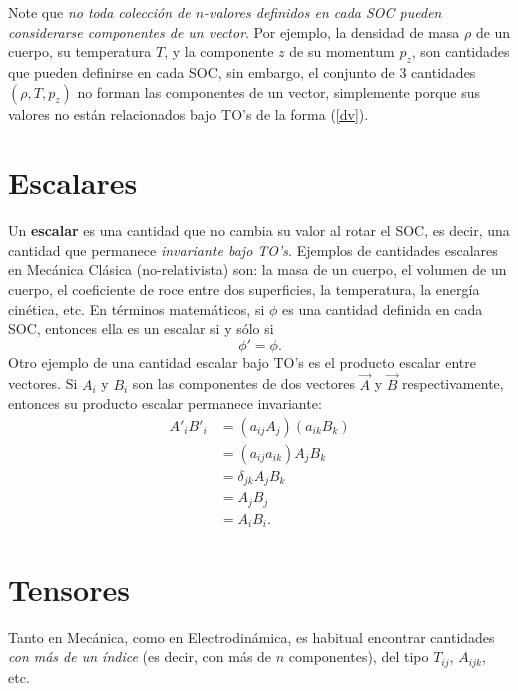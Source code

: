 Note que \textit{no toda colección de $n$-valores definidos en cada SOC pueden considerarse componentes de un vector}. Por ejemplo, la densidad de masa $\rho$ de un cuerpo, su temperatura $T$, y la componente $z$ de su momentum $p_z$, son cantidades que pueden definirse en cada SOC, sin embargo, el conjunto de 3 cantidades $(\rho,T,p_z)$ no forman las componentes de un vector, simplemente porque sus valores no están relacionados bajo TO's de la forma (\ref{dv}).



\section{Escalares}

Un \textbf{escalar} es una cantidad que no cambia su valor al rotar el SOC, es decir, una cantidad que permanece \textit{invariante bajo TO's}. Ejemplos de cantidades escalares en Mecánica Clásica (no-relativista) son: la masa de un cuerpo, el volumen de un cuerpo, el coeficiente de roce entre dos superficies, la temperatura, la energía cinética, etc. En términos matemáticos, si $\phi$ es una cantidad definida en cada SOC, entonces ella es un escalar si y sólo si
\begin{equation}
\phi'=\phi.
\end{equation}
Otro ejemplo de una cantidad escalar bajo TO's es el producto escalar entre vectores. Si $A_i$ y $B_i$ son las componentes de dos vectores $\vec{A}$ y $\vec{B}$ respectivamente, entonces su producto escalar permanece invariante:
\begin{align}
A'_iB'_i &= (a_{ij}A_j)(a_{ik}B_k) \\
&= (a_{ij}a_{ik})A_jB_k \\
&= \delta_{jk}A_jB_k \\ 
&= A_jB_j \\
&= A_iB_i.
\end{align}


\section{Tensores}
Tanto en Mecánica, como en Electrodinámica, es habitual encontrar cantidades \textit{con más de un índice} (es decir, con más de $n$ componentes), del tipo $T_{ij}$, $A_{ijk}$, etc. 

